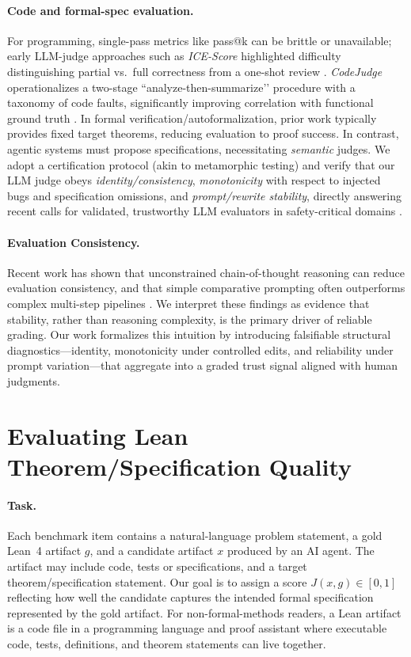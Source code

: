 \documentclass{article}
\begin{document}
\paragraph{Code and formal-spec evaluation.}
For programming, single-pass metrics like pass@k can be brittle or unavailable; early LLM-judge approaches such as \emph{ICE-Score} highlighted difficulty distinguishing partial vs.\ full correctness from a one-shot review \citep{Zhuo2024ICEScore}. \emph{CodeJudge} operationalizes a two-stage “analyze-then-summarize’’ procedure with a taxonomy of code faults, significantly improving correlation with functional ground truth \citep{TongZhang2024CodeJudge}. In formal verification/autoformalization, prior work typically provides fixed target theorems, reducing evaluation to proof success. In contrast, agentic systems must propose specifications, necessitating \emph{semantic} judges. We adopt a certification protocol (akin to metamorphic testing) and verify that our LLM judge obeys \emph{identity/consistency}, \emph{monotonicity} with respect to injected bugs and specification omissions, and \emph{prompt/rewrite stability}, directly answering recent calls for validated, trustworthy LLM evaluators in safety-critical domains \citep{Kocmi2024HumanVsLLM,Li2024TrustLLMJudgments}.

\paragraph{Evaluation Consistency.}
Recent work has shown that unconstrained chain-of-thought reasoning can reduce evaluation consistency, and that simple comparative prompting often outperforms complex multi-step pipelines \citep{chen2026rethinking}. We interpret these findings as evidence that stability, rather than reasoning complexity, is the primary driver of reliable grading. Our work formalizes this intuition by introducing falsifiable structural diagnostics---identity, monotonicity under controlled edits, and reliability under prompt variation---that aggregate into a graded trust signal aligned with human judgments.

\section{Evaluating Lean Theorem/Specification Quality}\label{sec:problem-setup}
\paragraph{Task.}
Each benchmark item contains a natural-language problem statement, a gold Lean~4 artifact
$g$, and a candidate artifact $x$ produced by an AI agent. The artifact may include code,
tests or specifications, and a target theorem/specification statement. Our goal is
to assign a score $J(x,g) \in [0,1]$ reflecting how well the candidate captures the intended formal specification represented
by the gold artifact.
For non-formal-methods readers, a Lean artifact is a code file in a programming language and proof assistant where executable code, tests, definitions, and theorem statements can live together.
\end{document}
